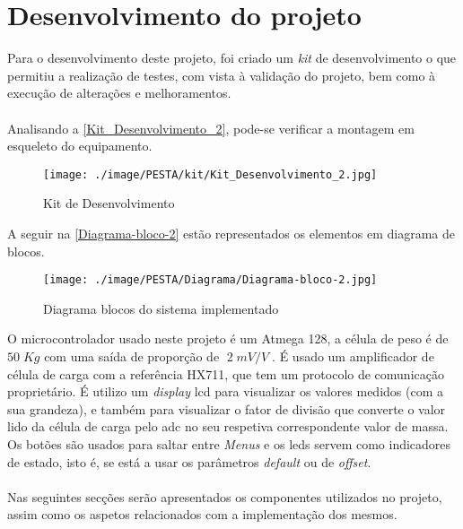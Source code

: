 \chapter{Desenvolvimento do projeto}
Para o desenvolvimento deste projeto, foi criado um \textit{kit} de desenvolvimento o que permitiu a realização de testes, com vista à validação do projeto, bem como à execução de alterações e melhoramentos.
\\
\\
Analisando a \autoref{Kit_Desenvolvimento_2}, pode-se verificar a montagem em esqueleto do equipamento.
\\
\begin{figure}[H]
	\centering
	\texttt{[image: ./image/PESTA/kit/Kit\_Desenvolvimento\_2.jpg]}
	\caption{Kit de Desenvolvimento}
	\label{Kit_Desenvolvimento_2}
\end{figure}
A seguir na \autoref{Diagrama-bloco-2} estão representados os elementos em diagrama de blocos.
\\
\begin{figure}[H]
	\centering
	\texttt{[image: ./image/PESTA/Diagrama/Diagrama-bloco-2.jpg]}
	\caption{Diagrama blocos do sistema implementado}
	\label{Diagrama-bloco-2}
\end{figure}
O microcontrolador usado neste projeto é um Atmega 128, a célula de peso é de $50 \; Kg$ com uma saída de proporção de $\; 2 \; mV/V \;$. É usado um amplificador de célula de carga com a referência HX711, que tem um protocolo de comunicação proprietário.
É utilizo um \textit{display} \acs{lcd} para visualizar os valores medidos (com a sua grandeza), e também para visualizar o fator de divisão que converte o valor lido da célula de carga pelo \acs{adc} no seu respetiva correspondente valor de massa. Os
botões são usados para saltar entre \textit{Menus} e os \acsp{led} servem como indicadores de estado, isto é, se está a usar os parâmetros \textit{default} ou de \textit{offset}.
\\
\\
Nas seguintes secções serão apresentados os componentes utilizados no projeto, assim como os aspetos relacionados com a implementação dos mesmos.
